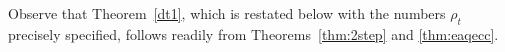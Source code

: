 \documentclass{article}
\theoremstyle{remark}
\theoremstyle{definition}
\numberwithin{equation}{section}
\begin{document}
%

Observe that Theorem~\ref{dt1}, which is restated below with the numbers $\rho_t$ precisely specified, follows readily from Theorems~\ref{thm:2step} and \ref{thm:eaqecc}.
\end{document}
